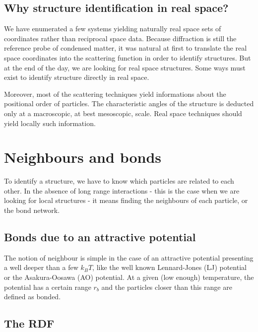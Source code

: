 \subsection{Why structure identification in real space?}

We have enumerated a few systems yielding naturally real space sets of coordinates rather than reciprocal space data. Because diffraction is still the reference probe of condensed matter, it was natural at first to translate the real space coordinates into the scattering function in order to identify structures. But at the end of the day, we are looking for real space structures. Some ways must exist to identify structure directly in real space.

Moreover, most of the scattering techniques yield informations about the positional order of particles. The characteristic angles of the structure is deducted only at a macroscopic, at best mesoscopic, scale. Real space techniques should yield locally such information.

\section{Neighbours and bonds}
\label{sec:neighbours_bonds}

To identify a structure, we have to know which particles are related to each other. In the absence of long range interactions - this is the case when we are looking for local structures - it means finding the neighbours of each particle, or the bond network.

\subsection{Bonds due to an attractive potential}

The notion of neighbour is simple in the case of an attractive potential presenting a well deeper than a few $k_{B}T$, like the well known Lennard-Jones (LJ) potential or the Asakura-Oosawa (AO) potential. At a given (low enough) temperature, the potential has a certain range $r_b$ and the particles closer than this range are defined as bonded.

\subsection{The \texorpdfstring{\acf{RDF}}{\acl{RDF}}}
\label{sec:rdf}

